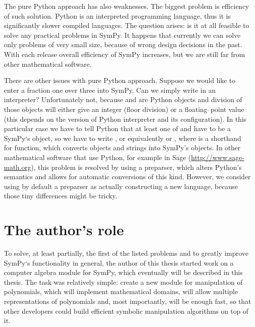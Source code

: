 The pure Python approach has also weaknesses. The biggest problem is efficiency of such
solution. Python is an interpreted programming language, thus it is significantly slower
compiled languages. The question arises: is it at all feasible to solve any practical
problems in SymPy. It happens that currently we can solve only problems of very small
size, because of wrong design decisions in the past. With each release overall efficiency
of SymPy increases, but we are still far from other mathematical software.

There are other issues with pure Python approach. Suppose we would like to enter a fraction
one over three into SymPy. Can we simply write  in an interpreter? Unfortunately
not, because  and  are Python objects and division of those objects will either
give an integer (floor division) or a floating--point value (this depends on the version
of Python interpreter and its configuration). In this particular case we have to tell Python
that at least one of  and  have to be a SymPy`s object, so we have to write
, or equivalently  or , where  is a shorthand
for  function, which converts objects and strings into SymPy's objects. In
other mathematical software that use Python, for example in Sage (\href{http://www.sage-math.org}{http://www.sage-math.org}),
this problem is resolved by using a preparser, which alters Python's semantics and allows
for automatic conversions of this kind. However, we consider using by default a preparser
as actually constructing a new language, because those tiny differences might be tricky.


\section{The author's role}

To solve, at least partially, the first of the listed problems and to greatly improve
SymPy`s functionality in general, the author of this thesis started work on a computer
algebra module for SymPy, which eventually will be described in this thesis. The task
was relatively simple: create a new module for manipulation of polynomials, which will
implement mathematical domains, will allow multiple representations of polynomials and,
most importantly, will be enough fast, so that other developers could build efficient
symbolic manipulation algorithms on top of it.

